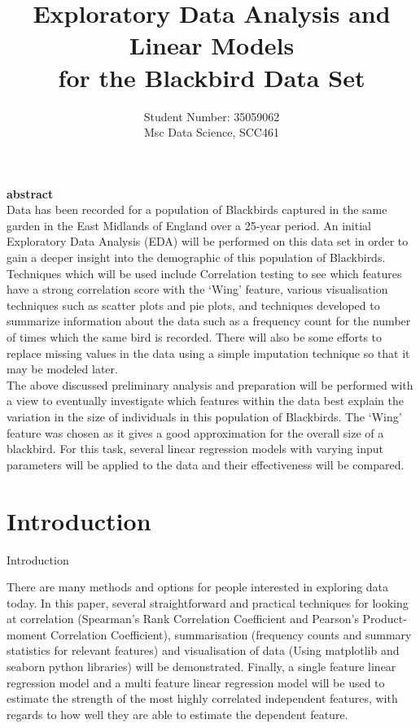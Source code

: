 \documentclass{article}
\begin{document}
\title{
  Exploratory Data Analysis and Linear Models \\
  \large for the Blackbird Data Set \\
}

\author{Student Number: 35059062 \\ 
Msc Data Science, SCC461}

\maketitle

\textbf{abstract}\\
Data has been recorded for a population of Blackbirds captured in the same garden in the East Midlands of England over a 25-year period. An initial Exploratory Data Analysis (EDA) will be performed on this data set in order to gain a deeper insight into the demographic of this population of Blackbirds. \\

Techniques which will be used include Correlation testing to see which features have a strong correlation score with the ‘Wing’ feature, various visualisation techniques such as scatter plots and pie plots, and techniques developed to summarize information about the data such as a frequency count for the number of times which the same bird is recorded. There will also be some efforts to replace missing values in the data using a simple imputation technique so that it may be modeled later. \\

The above discussed preliminary analysis and preparation will be performed with a view to eventually investigate which features within the data best explain the variation in the size of individuals in this population of Blackbirds. The ‘Wing’ feature was chosen as it gives a good approximation for the overall size of a blackbird. For this task, several linear regression models with varying input parameters will be applied to the data and their effectiveness will be compared.  

\section{Introduction}
Introduction 

There are many methods and options for people interested in exploring data today. In this paper, several straightforward and practical techniques for looking at correlation (Spearman’s Rank Correlation Coefficient and Pearson’s Product-moment Correlation Coefficient), summarisation (frequency counts and summary statistics for relevant features) and visualisation of data (Using matplotlib and seaborn python libraries) will be demonstrated. Finally, a single feature linear regression model and a multi feature linear regression model will be used to estimate the strength of the most highly correlated independent features, with regards to how well they are able to estimate the dependent feature. 
\end{document}

